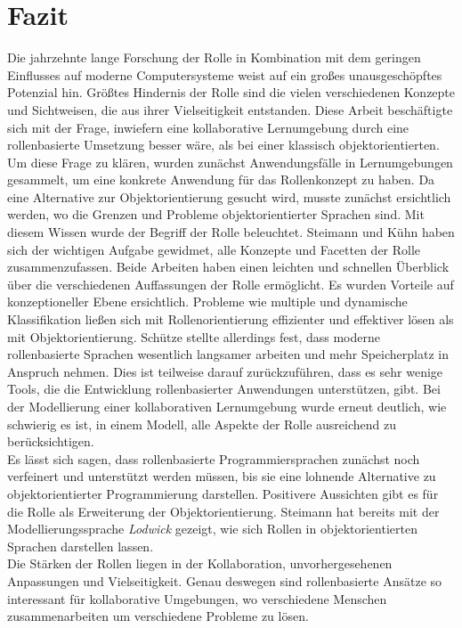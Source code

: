 \documentclass[conference]{IEEEtran}
\begin{document}
\section{Fazit}
Die jahrzehnte lange Forschung der Rolle in Kombination mit dem geringen Einflusses auf moderne Computersysteme weist auf ein großes unausgeschöpftes Potenzial hin. Größtes Hindernis der Rolle sind die vielen verschiedenen Konzepte und Sichtweisen, die aus ihrer Vielseitigkeit entstanden. 
Diese Arbeit beschäftigte sich mit der Frage, inwiefern eine kollaborative Lernumgebung durch eine rollenbasierte Umsetzung besser wäre, als bei einer klassisch objektorientierten. Um diese Frage zu klären, wurden zunächst Anwendungsfälle in Lernumgebungen gesammelt, um eine konkrete Anwendung für das Rollenkonzept zu haben. Da eine Alternative zur Objektorientierung gesucht wird, musste zunächst ersichtlich werden, wo die Grenzen und Probleme objektorientierter Sprachen sind. Mit diesem Wissen wurde der Begriff der Rolle beleuchtet. Steimann \cite{steimann2000representation} und Kühn \cite{family} haben sich der wichtigen Aufgabe gewidmet, alle Konzepte und Facetten der Rolle zusammenzufassen. Beide Arbeiten haben einen leichten und schnellen Überblick über die verschiedenen Auffassungen der Rolle ermöglicht. Es wurden Vorteile auf konzeptioneller Ebene ersichtlich. Probleme wie multiple und dynamische Klassifikation ließen sich mit Rollenorientierung effizienter und effektiver lösen als mit Objektorientierung. Schütze stellte allerdings fest, dass moderne rollenbasierte Sprachen wesentlich langsamer arbeiten und mehr Speicherplatz in Anspruch nehmen. Dies ist teilweise darauf zurückzuführen, dass es sehr wenige Tools, die die Entwicklung rollenbasierter Anwendungen unterstützen, gibt. Bei der Modellierung einer kollaborativen Lernumgebung wurde erneut deutlich, wie schwierig es ist, in einem Modell, alle Aspekte der Rolle ausreichend zu berücksichtigen. \\ Es lässt sich sagen, dass rollenbasierte Programmiersprachen zunächst noch verfeinert und unterstützt werden müssen, bis sie eine lohnende Alternative zu objektorientierter Programmierung darstellen. Positivere Aussichten gibt es für die Rolle als Erweiterung der Objektorientierung. Steimann hat bereits mit der Modellierungssprache \textit{Lodwick} gezeigt, wie sich Rollen in objektorientierten Sprachen darstellen lassen. \\ Die Stärken der Rollen liegen in der Kollaboration, unvorhergesehenen Anpassungen und Vielseitigkeit. Genau deswegen sind rollenbasierte Ansätze so interessant für kollaborative Umgebungen, wo verschiedene Menschen zusammenarbeiten um verschiedene Probleme zu lösen. 
{}



\end{document}
